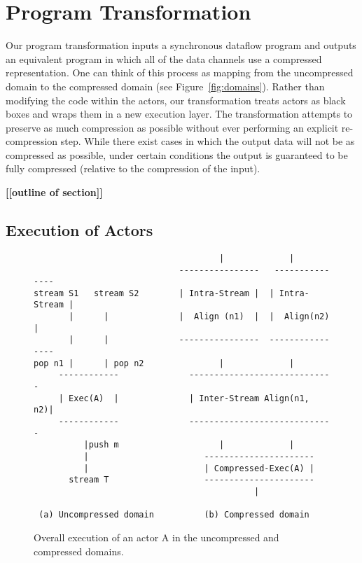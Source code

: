 \section{Program Transformation}

Our program transformation inputs a synchronous dataflow program and
outputs an equivalent program in which all of the data channels use a
compressed representation.  One can think of this process as mapping
from the uncompressed domain to the compressed domain (see
Figure~\ref{fig:domains}).  Rather than modifying the code within the
actors, our transformation treats actors as black boxes and wraps them
in a new execution layer.  The transformation attempts to preserve as
much compression as possible without ever performing an explicit
re-compression step.  While there exist cases in which the output data
will not be as compressed as possible, under certain conditions the
output is guaranteed to be fully compressed (relative to the
compression of the input).

{\bf [[outline of section]]}

\subsection{Execution of Actors}

\begin{figure}[t]
\scriptsize
\begin{verbatim}
                                     |             |
                             ----------------   ---------------
stream S1   stream S2        | Intra-Stream |  | Intra-Stream |
       |      |              |  Align (n1)  |  |  Align(n2)   |
       |      |              ----------------  ----------------
pop n1 |      | pop n2               |             |
     ------------              -----------------------------
     | Exec(A)  |              | Inter-Stream Align(n1, n2)|
     ------------              -----------------------------
          |push m                    |             |
          |                       ----------------------
          |                       | Compressed-Exec(A) |
       stream T                   ----------------------
                                            |

 (a) Uncompressed domain          (b) Compressed domain
\end{verbatim}
\caption{Overall execution of an actor A in the uncompressed and compressed domains.
\protect\label{fig:actor-pic}}
\end{figure}

